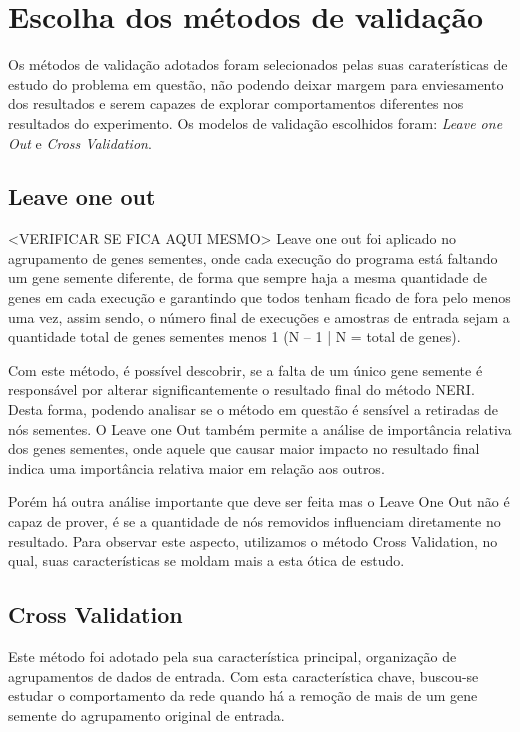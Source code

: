 \section{Escolha dos métodos de validação}
Os métodos de validação adotados foram selecionados pelas suas caraterísticas de estudo do problema em questão, não podendo deixar margem para enviesamento dos resultados e serem capazes de explorar comportamentos diferentes nos resultados do experimento. Os modelos de validação escolhidos foram: \textit{Leave one Out} e \textit{Cross Validation}.


\subsection{Leave one out}
<VERIFICAR SE FICA  AQUI MESMO>
Leave one out foi aplicado no agrupamento de genes sementes, onde cada execução do programa está faltando um gene semente diferente, de forma que sempre haja a mesma quantidade de genes em cada execução e garantindo que todos tenham ficado de fora pelo menos uma vez, assim sendo, o número final de execuções e amostras de entrada sejam a quantidade total de genes sementes menos 1 (N – 1 | N = total de genes).

Com este método, é possível descobrir, se a falta de um único gene semente é responsável por alterar significantemente o resultado final do método NERI. Desta forma, podendo analisar se o método em questão é sensível a retiradas de nós sementes. 
O Leave one Out também permite a análise de importância relativa dos genes sementes, onde aquele que causar maior impacto no resultado final indica uma importância relativa maior em relação aos outros. 


Porém há outra análise importante que deve ser feita mas o Leave One Out não é capaz de prover, é se a quantidade de nós removidos influenciam diretamente no resultado. Para observar este aspecto, utilizamos o método Cross Validation, no qual, suas características se moldam mais a esta ótica de estudo.


\subsection{Cross Validation}

Este método foi adotado pela sua característica principal, organização de agrupamentos de dados de entrada. Com esta característica chave, buscou-se estudar o comportamento da rede quando há a remoção de mais de um gene semente do agrupamento original de entrada.

